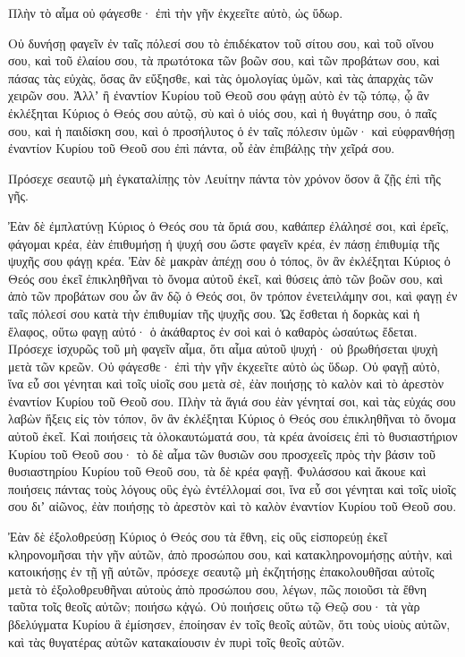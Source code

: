 {Πλὴν τὸ αἷμα οὐ φάγεσθε· ἐπὶ τὴν γῆν ἐκχεεῖτε αὐτὸ, ὡς ὕδωρ.
\par }{\PP {}Οὐ δυνήσῃ φαγεῖν ἐν ταῖς πόλεσί σου τὸ ἐπιδέκατον τοῦ σίτου σου, καὶ τοῦ οἴνου σου, καὶ τοῦ ἐλαίου σου, τὰ πρωτότοκα τῶν βοῶν σου, καὶ τῶν προβάτων σου, καὶ πάσας τὰς εὐχὰς, ὅσας ἂν εὔξησθε, καὶ τὰς ὁμολογίας ὑμῶν, καὶ τὰς ἀπαρχὰς τῶν χειρῶν σου.
Ἀλλʼ ἢ ἐναντίον Κυρίου τοῦ Θεοῦ σου φάγῃ αὐτὸ ἐν τῷ τόπῳ, ᾧ ἂν ἐκλέξηται Κύριος ὁ Θεός σου αὐτῷ, σὺ καὶ ὁ υἱός σου, καὶ ἡ θυγάτηρ σου, ὁ παῖς σου, καὶ ἡ παιδίσκη σου, καὶ ὁ προσήλυτος ὁ ἐν ταῖς πόλεσιν ὑμῶν· καὶ εὐφρανθήσῃ ἐναντίον Κυρίου τοῦ Θεοῦ σου ἐπὶ πάντα, οὗ ἐὰν ἐπιβάλῃς τὴν χεῖρά σου.
\par }{\PP {}Πρόσεχε σεαυτῷ μὴ ἐγκαταλίπῃς τὸν Λευίτην πάντα τὸν χρόνον ὅσον ἂ ζῇς ἐπὶ τῆς γῆς.
\par }{\PP {}Ἐὰν δὲ ἐμπλατύνῃ Κύριος ὁ Θεός σου τὰ ὅριά σου, καθάπερ ἐλάλησέ σοι, καὶ ἐρεῖς, φάγομαι κρέα, ἐὰν ἐπιθυμήσῃ ἡ ψυχή σου ὥστε φαγεῖν κρέα, ἐν πάσῃ ἐπιθυμίᾳ τῆς ψυχῆς σου φάγῃ κρέα.
Ἐὰν δὲ μακρὰν ἀπέχῃ σου ὁ τόπος, ὃν ἂν ἐκλέξηται Κύριος ὁ Θεός σου ἐκεῖ ἐπικληθῆναι τὸ ὄνομα αὐτοῦ ἐκεῖ, καὶ θύσεις ἀπὸ τῶν βοῶν σου, καὶ ἀπὸ τῶν προβάτων σου ὧν ἂν δῷ ὁ Θεός σοι, ὃν τρόπον ἐνετειλάμην σοι, καὶ φαγῃ ἐν ταῖς πόλεσί σου κατὰ τὴν ἐπιθυμίαν τῆς ψυχῆς σου.
Ὡς ἔσθεται ἡ δορκὰς καὶ ἡ ἔλαφος, οὕτω φαγῃ αὐτό· ὁ ἀκάθαρτος ἐν σοὶ καὶ ὁ καθαρὸς ὡσαύτως ἔδεται.
Πρόσεχε ἰσχυρῶς τοῦ μὴ φαγεῖν αἷμα, ὅτι αἷμα αὐτοῦ ψυχή· οὐ βρωθήσεται ψυχὴ μετὰ τῶν κρεῶν.
Οὐ φάγεσθε· ἐπὶ τὴν γῆν ἐκχεεῖτε αὐτὸ ὡς ὕδωρ.
Οὐ φαγῇ αὐτὸ, ἵνα εὖ σοι γένηται καὶ τοῖς υἱοῖς σου μετὰ σὲ, ἐὰν ποιήσῃς τὸ καλὸν καὶ τὸ ἀρεστὸν ἐναντίον Κυρίου τοῦ Θεοῦ σου.
Πλὴν τὰ ἅγιά σου ἐὰν γένηταί σοι, καὶ τὰς εὐχάς σου λαβὼν ἥξεις εἰς τὸν τόπον, ὃν ἂν ἐκλέξηται Κύριος ὁ Θεός σου ἐπικληθῆναι τὸ ὄνομα αὐτοῦ ἐκεῖ.
Καὶ ποιήσεις τὰ ὁλοκαυτώματά σου, τὰ κρέα ἀνοίσεις ἐπὶ τὸ θυσιαστήριον Κυρίου τοῦ Θεοῦ σου· τὸ δὲ αἷμα τῶν θυσιῶν σου προσχεεῖς πρὸς τὴν βάσιν τοῦ θυσιαστηρίου Κυρίου τοῦ Θεοῦ σου, τὰ δὲ κρέα φαγῇ.
Φυλάσσου καὶ ἄκουε καὶ ποιήσεις πάντας τοὺς λόγους οὓς ἐγὼ ἐντέλλομαί σοι, ἵνα εὖ σοι γένηται καὶ τοῖς υἱοῖς σου διʼ αἰῶνος, ἐὰν ποιήσῃς τὸ ἀρεστὸν καὶ τὸ καλὸν ἐναντίον Κυρίου τοῦ Θεοῦ σου.
\par }{\PP {}Ἐὰν δὲ ἐξολοθρεύσῃ Κύριος ὁ Θεός σου τὰ ἔθνη, εἰς οὓς εἰσπορεύῃ ἐκεῖ κληρονομῆσαι τὴν γῆν αὐτῶν, ἀπὸ προσώπου σου, καὶ κατακληρονομήσῃς αὐτὴν, καὶ κατοικήσῃς ἐν τῇ γῇ αὐτῶν,
πρόσεχε σεαυτῷ μὴ ἐκζητήσῃς ἐπακολουθῆσαι αὐτοῖς μετὰ τὸ ἐξολοθρευθῆναι αὐτοὺς ἀπὸ προσώπου σου, λέγων, πῶς ποιοῦσι τὰ ἔθνη ταῦτα τοῖς θεοῖς αὐτῶν; ποιήσω κᾀγώ.
Οὐ ποιήσεις οὕτω τῷ Θεῷ σου· τὰ γὰρ βδελύγματα Κυρίου ἃ ἐμίσησεν, ἐποίησαν ἐν τοῖς θεοῖς αὐτῶν, ὅτι τοὺς υἱοὺς αὐτῶν, καὶ τὰς θυγατέρας αὐτῶν κατακαίουσιν ἐν πυρὶ τοῖς θεοῖς αὐτῶν.

}
